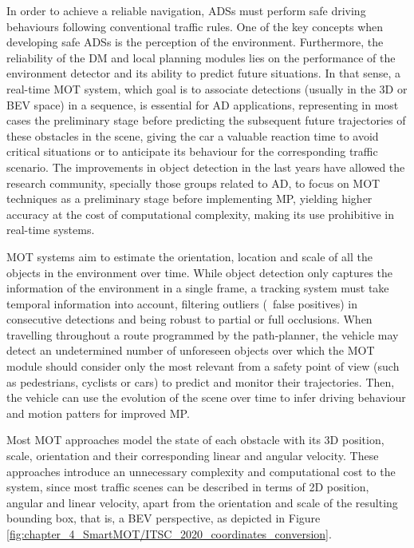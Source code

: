In order to achieve a reliable navigation, \acfp{ADS} must perform safe driving behaviours following conventional traffic rules. One of the key concepts when developing safe \acp{ADS} is the perception of the environment. Furthermore, the reliability of the \ac{DM} and local planning modules lies on the performance of the environment detector and its ability to predict future situations. In that sense, a real-time \ac{MOT} system, which goal is to associate detections (usually in the 3D or \ac{BEV} space) in a sequence, is essential for \ac{AD} applications, representing in most cases the preliminary stage before predicting the subsequent future trajectories of these obstacles in the scene, giving the car a valuable reaction time to avoid critical situations or to anticipate its behaviour for the corresponding traffic scenario. The improvements in object detection in the last years have allowed the research community, specially those groups related to \ac{AD}, to focus on \ac{MOT} techniques as a preliminary stage before implementing \ac{MP}, yielding higher accuracy at the cost of computational complexity, making its use prohibitive in real-time systems. 

\ac{MOT} systems aim to estimate the orientation, location and scale of all the objects in the environment over time. While object detection only captures the information of the environment in a single frame, a tracking system must take temporal information into account, filtering outliers (\aka \ false positives) in consecutive detections and being robust to partial or full occlusions. When travelling throughout a route programmed by the path-planner, the vehicle may detect an undetermined number of unforeseen objects over which the \ac{MOT} module should consider only the most relevant from a safety point of view (such as pedestrians, cyclists or cars) to predict and monitor their trajectories. Then, the vehicle can use the evolution of the scene over time to infer driving behaviour and motion patters for improved \ac{MP}.

Most \ac{MOT} approaches \cite{weng20203d, chiu2021probabilistic} model the state of each obstacle with its 3D position, scale, orientation and their corresponding linear and angular velocity. These approaches introduce an unnecessary complexity and computational cost to the system, since most traffic scenes can be described in terms of 2D position, angular and linear velocity, apart from the orientation and scale of the resulting bounding box, that is, a \ac{BEV} perspective, as depicted in Figure \ref{fig:chapter_4_SmartMOT/ITSC_2020_coordinates_conversion}. 

